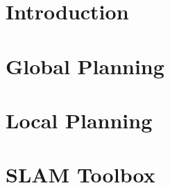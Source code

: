 \section{Introduction}
\newpage
\section{Global Planning}
\newpage
\section{Local Planning}
\newpage
\section{SLAM Toolbox}